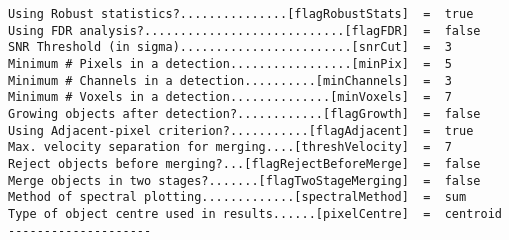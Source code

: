 {\begin{verbatim}
Using Robust statistics?...............[flagRobustStats]  =  true
Using FDR analysis?............................[flagFDR]  =  false
SNR Threshold (in sigma)........................[snrCut]  =  3
Minimum # Pixels in a detection.................[minPix]  =  5
Minimum # Channels in a detection..........[minChannels]  =  3
Minimum # Voxels in a detection..............[minVoxels]  =  7
Growing objects after detection?............[flagGrowth]  =  false
Using Adjacent-pixel criterion?...........[flagAdjacent]  =  true
Max. velocity separation for merging....[threshVelocity]  =  7
Reject objects before merging?...[flagRejectBeforeMerge]  =  false
Merge objects in two stages?.......[flagTwoStageMerging]  =  false
Method of spectral plotting.............[spectralMethod]  =  sum
Type of object centre used in results......[pixelCentre]  =  centroid
--------------------
\end{verbatim}
}
